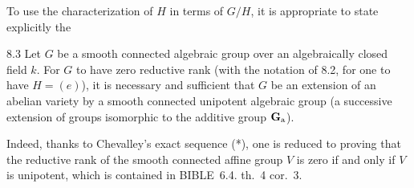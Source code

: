 To use the characterization of $H$ in terms of $G/H$, it is appropriate to state explicitly the
\begin{corollary}{8.3}\label{XII.8.3}
Let $G$ be a smooth connected algebraic group over an algebraically closed field $k$. For $G$ to have zero reductive rank (\ie with the notation of 8.2, for one to have $H=(e)$), it is necessary and sufficient that $G$ be an extension of an abelian variety by a smooth connected unipotent algebraic group (\ie a successive extension of groups isomorphic to the additive group $\mathbf{G}_{\mathrm{a}}$).
\end{corollary}
Indeed, thanks to Chevalley's exact sequence (*), one is reduced to proving that the reductive rank of the smooth connected affine group $V$ is zero if and only if $V$ is unipotent, which is contained in BIBLE~6.4. th.~4 cor.~3.

